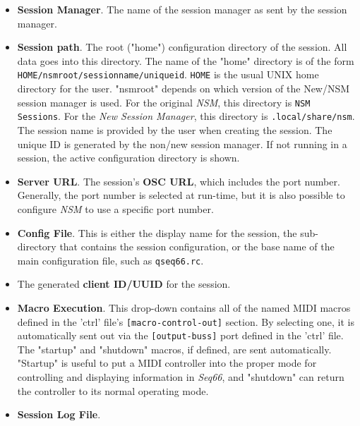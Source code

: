    \begin{itemize}
      \item \textbf{Session Manager}. The name of the session manager as
         sent by the session manager.
      \item \textbf{Session path}.
         The root ("home") configuration directory of the session.
         All data goes into this directory.
         The name of the "home" directory is of the form
         \texttt{HOME/nsmroot/sessionname/uniqueid}.
         \texttt{HOME} is the usual UNIX home directory for the user.
         "nsmroot" depends on which version of the New/NSM session manager is
         used.
         For the original \textsl{NSM}, this directory is \texttt{NSM Sessions}.
         For the \textsl{New Session Manager}, this directory is
         \texttt{.local/share/nsm}.
         The session name is provided by the user when creating the
         session.
         The unique ID is generated by the non/new session manager.
         If not running in a session,
         the active configuration directory is shown.
      \item \textbf{Server URL}.
         The session's \textbf{OSC URL}, which includes the port number.
         Generally, the port number is selected at run-time, but it is also
         possible to configure \textsl{NSM} to use a specific port number.
      \item \textbf{Config File}.
         This is either the display name for the session, the
         sub-directory that contains the session configuration, or
         the base name of the main configuration file,
         such as \texttt{qseq66.rc}.
      \item The generated \textbf{client ID/UUID} for the session.
      \item \textbf{Macro Execution}.
         This drop-down contains all of the named MIDI macros
         defined in the 'ctrl' file's
         \texttt{[macro-control-out]} section.
         By selecting one, it is automatically sent out via the
         \texttt{[output-buss]} port defined in the 'ctrl' file.
         The "startup" and "shutdown" macros, if defined,
         are sent automatically. "Startup" is useful to put
         a MIDI controller into the proper mode for controlling and displaying
         information in \textsl{Seq66}, and "shutdown" can return the controller
         to its normal operating mode.
      \item \textbf{Session Log File}.

\end{itemize}
